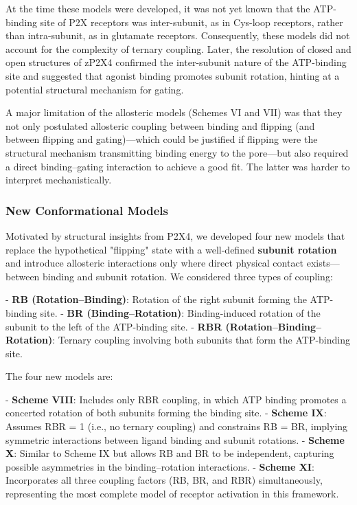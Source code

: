 \documentclass[pdflatex,sn-mathphys-num]{sn-jnl}%
\theoremstyle{thmstyleone}%
\theoremstyle{thmstyletwo}%
\theoremstyle{thmstylethree}%
\begin{document}
At the time these models were developed, it was not yet known that the ATP-binding site of P2X receptors was inter-subunit, as in Cys-loop receptors, rather than intra-subunit, as in glutamate receptors. Consequently, these models did not account for the complexity of ternary coupling. Later, the resolution of closed and open structures of zP2X4 \cite{cerrada_p2x, abierta_p2x} confirmed the inter-subunit nature of the ATP-binding site and suggested that agonist binding promotes subunit rotation, hinting at a potential structural mechanism for gating.

A major limitation of the allosteric models (Schemes VI and VII) was that they not only postulated allosteric coupling between binding and flipping (and between flipping and gating)—which could be justified if flipping were the structural mechanism transmitting binding energy to the pore—but also required a direct binding–gating interaction to achieve a good fit. The latter was harder to interpret mechanistically. 

\subsubsection{New Conformational Models}

Motivated by structural insights from P2X4, we developed four new models that replace the hypothetical "flipping" state with a well-defined \textbf{subunit rotation} and introduce allosteric interactions only where direct physical contact exists—between binding and subunit rotation. We considered three types of coupling:

- \textbf{RB (Rotation–Binding)}: Rotation of the right subunit forming the ATP-binding site.  
- \textbf{BR (Binding–Rotation)}: Binding-induced rotation of the subunit to the left of the ATP-binding site.  
- \textbf{RBR (Rotation–Binding–Rotation)}: Ternary coupling involving both subunits that form the ATP-binding site.  

The four new models are:

- \textbf{Scheme VIII}: Includes only RBR coupling, in which ATP binding promotes a concerted rotation of both subunits forming the binding site.  
- \textbf{Scheme IX}: Assumes RBR = 1 (i.e., no ternary coupling) and constrains RB = BR, implying symmetric interactions between ligand binding and subunit rotations.  
- \textbf{Scheme X}: Similar to Scheme IX but allows RB and BR to be independent, capturing possible asymmetries in the binding–rotation interactions.  
- \textbf{Scheme XI}: Incorporates all three coupling factors (RB, BR, and RBR) simultaneously, representing the most complete model of receptor activation in this framework.  
\end{document}
